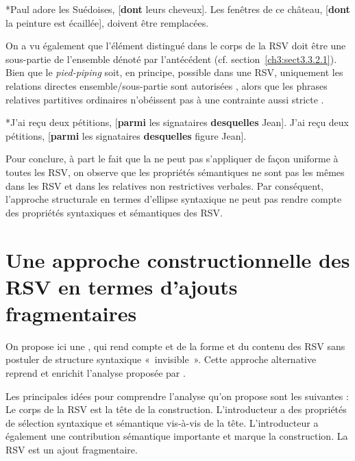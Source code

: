 \ea \label{ch3:ex110}
\ea 
*Paul adore les Suédoises, [\textbf{dont} leurs cheveux]. 
\ex
Les fenêtres de ce château, [\textbf{dont} la peinture est écaillée], doivent être remplacées.
\z 
\z

On a vu également que l’élément distingué dans le corps de la RSV doit être une sous-partie de l’ensemble dénoté par l’antécédent (cf. section~\ref{ch3:sect3.3.2.1}). Bien que le \textit{pied-piping} soit, en principe, possible dans une RSV, uniquement les relations directes ensemble/sous-partie sont autorisées , alors que les phrases relatives partitives ordinaires n’obéissent pas à une contrainte aussi stricte .   

\ea \label{ch3:ex111}
\ea 
*J’ai reçu deux pétitions, [\textbf{parmi} les signataires \textbf{desquelles} Jean]. \label{ch3:ex111a} 
\ex
J’ai reçu deux pétitions, [\textbf{parmi} les signataires \textbf{desquelles} figure Jean]. \label{ch3:ex111b} 
\z
\z

Pour conclure, à part le fait que la  ne peut pas s’appliquer de façon uniforme à toutes les RSV, on observe que les propriétés sémantiques ne sont pas les mêmes dans les RSV et dans les relatives non restrictives verbales. Par conséquent, l’approche structurale en termes d’ellipse syntaxique ne peut pas rendre compte des propriétés syntaxiques et sémantiques des RSV. 


\section{Une approche constructionnelle des RSV en termes d’ajouts fragmentaires}\label{ch3:sect3.5}
 
On propose ici une , qui rend compte et de la forme et du contenu des RSV sans postuler de structure syntaxique «~invisible~». Cette approche alternative reprend et enrichit l’analyse proposée par \citet{BilbiieEtAl2009}. 

Les principales idées pour comprendre l’analyse qu’on propose sont les suivantes : Le corps de la RSV est la tête de la construction. L’introducteur a des propriétés de sélection syntaxique et sémantique vis-à-vis de la tête. L’introducteur a également une contribution sémantique importante et marque la construction. La RSV est un ajout fragmentaire.
 
